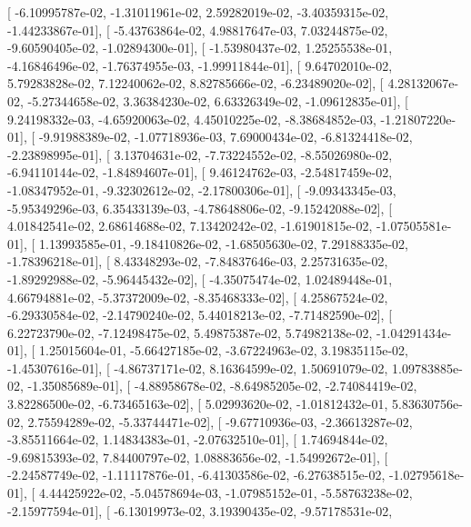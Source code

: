 \documentclass{article}
\begin{document}
       [ -6.10995787e-02,  -1.31011961e-02,   2.59282019e-02,
         -3.40359315e-02,  -1.44233867e-01],
       [ -5.43763864e-02,   4.98817647e-03,   7.03244875e-02,
         -9.60590405e-02,  -1.02894300e-01],
       [ -1.53980437e-02,   1.25255538e-01,  -4.16846496e-02,
         -1.76374955e-03,  -1.99911844e-01],
       [  9.64702010e-02,   5.79283828e-02,   7.12240062e-02,
          8.82785666e-02,  -6.23489020e-02],
       [  4.28132067e-02,  -5.27344658e-02,   3.36384230e-02,
          6.63326349e-02,  -1.09612835e-01],
       [  9.24198332e-03,  -4.65920063e-02,   4.45010225e-02,
         -8.38684852e-03,  -1.21807220e-01],
       [ -9.91988389e-02,  -1.07718936e-03,   7.69000434e-02,
         -6.81324418e-02,  -2.23898995e-01],
       [  3.13704631e-02,  -7.73224552e-02,  -8.55026980e-02,
         -6.94110144e-02,  -1.84894607e-01],
       [  9.46124762e-03,  -2.54817459e-02,  -1.08347952e-01,
         -9.32302612e-02,  -2.17800306e-01],
       [ -9.09343345e-03,  -5.95349296e-03,   6.35433139e-03,
         -4.78648806e-02,  -9.15242088e-02],
       [  4.01842541e-02,   2.68614688e-02,   7.13420242e-02,
         -1.61901815e-02,  -1.07505581e-01],
       [  1.13993585e-01,  -9.18410826e-02,  -1.68505630e-02,
          7.29188335e-02,  -1.78396218e-01],
       [  8.43348293e-02,  -7.84837646e-03,   2.25731635e-02,
         -1.89292988e-02,  -5.96445432e-02],
       [ -4.35075474e-02,   1.02489448e-01,   4.66794881e-02,
         -5.37372009e-02,  -8.35468333e-02],
       [  4.25867524e-02,  -6.29330584e-02,  -2.14790240e-02,
          5.44018213e-02,  -7.71482590e-02],
       [  6.22723790e-02,  -7.12498475e-02,   5.49875387e-02,
          5.74982138e-02,  -1.04291434e-01],
       [  1.25015604e-01,  -5.66427185e-02,  -3.67224963e-02,
          3.19835115e-02,  -1.45307616e-01],
       [ -4.86737171e-02,   8.16364599e-02,   1.50691079e-02,
          1.09783885e-02,  -1.35085689e-01],
       [ -4.88958678e-02,  -8.64985205e-02,  -2.74084419e-02,
          3.82286500e-02,  -6.73465163e-02],
       [  5.02993620e-02,  -1.01812432e-01,   5.83630756e-02,
          2.75594289e-02,  -5.33744471e-02],
       [ -9.67710936e-03,  -2.36613287e-02,  -3.85511664e-02,
          1.14834383e-01,  -2.07632510e-01],
       [  1.74694844e-02,  -9.69815393e-02,   7.84400797e-02,
          1.08883656e-02,  -1.54992672e-01],
       [ -2.24587749e-02,  -1.11117876e-01,  -6.41303586e-02,
         -6.27638515e-02,  -1.02795618e-01],
       [  4.44425922e-02,  -5.04578694e-03,  -1.07985152e-01,
         -5.58763238e-02,  -2.15977594e-01],
       [ -6.13019973e-02,   3.19390435e-02,  -9.57178531e-02,
\end{document}

